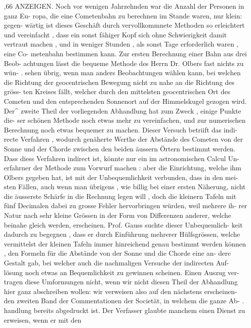 \documentclass[12pt,a4paper]{article}
\begin{document}
,66  ANZEIGEN.
Noch  vor  wenigen  Jahrzehnden  war  die  Anzahl  der  Personen  in  ganz  Eu-
ropa, die  eine  Cometenbahn  zu  berechnen  im  Stande  waren,  nur  klein:  gegen-
wärtig ist  dieses  Geschäft  durch  vervollkommnete  Methoden  so  erleichtert  und
vereinfacht ,  dass  ein  sonst  fähiger  Kopf  sich  ohne  Schwierigkeit  damit  vertraut
machen ,  und  in  weniger  Stunden ,  als  sonst  Tage  erforderlich  waren ,  eine  Co-
metenbahn bestimmen  kann.  Zur  ersten  Berechnung  einer  Bahn  aus  drei  Beob-
achtungen lässt  die  bequeme  Methode  des  Herrn  Dr.  Olbers  fast  nichts  zu  wün- .
sehen  übrig,  wenn  man  anders  Beobachtungen  wählen  kann,  bei  welchen  die
Richtung  der  geocentrischen  Bewegung  nicht  zu  nahe  an  die  Richtung  des  gröss-
ten  Kreises  fällt,  welcher  durch  den  mittelsten  geocentrischen  Ort  des  Cometen
und  den  entsprechenden  Sonnenort  auf  der  Himmelskugel  gezogen  wird.  Der\^{}
zweite  Theil  der  vorliegenden  Abhandlung  hat  zum  Zweck ,  einige  Punkte  die-
ser schönen  Methode  noch  etwas  mehr  zu  vereinfachen,  und  zur  numerischen
Berechnung  noch  etwas  bequemer  zu  machen.  Dieser  Versuch  betriift  das  indi-
recte  Verfahren ,  wodurch  genäherte  Werthe  der  Abstände  des  Cometen  von  der
Sonne  und  der  Chorde  zwischen  den  beiden  äussern  Örtern  bestimmt  werden.
Dass  diess  Verfahren  indirect  ist,  könnte  nur  ein  im  astronomischen  Calcul  Un-
erfahrner der  Methode  zum  Vorwurf  machen :  aber  die  Einrichtung,  welche  ihm
Olbers  gegeben  hat,  ist  mit  der  Unbequemlichkeit  verbunden,  dass  in  den  mei-
sten Fällen,  auch  wenn  man  übrigens ,  wie  billig  bei  einer  ersten  Näherung,  nicht
die  äusserste  Schärfe  in  die  Rechnung  legen  will ,  doch  die  kleinern  Tafeln  mit
fünf  Decimalen  dabei  zu  grosse  Fehler  hervorbringen  würden,  weil  mehrere  ih-
rer Natur  nach  sehr  kleine  Grössen  in  der  Form  von  Differenzen  anderer,  welche
beinahe  gleich  werden,  erscheinen.  Prof.  Gauss  suchte  dieser  Unbequemlich-
keit dadurch  zu  begegnen ,  dass  er  durch  Einführung  mehrerer  Hülfsgrössen,
welche  vermittelst  der  kleinen  Tafeln  immer  hinreichend  genau  bestimmt  werden
können ,  den  Formeln  für  die  Abstände  von  der  Sonne  und  die  Chorde  eine  an-
dere Gestalt  gab,  bei  welcher  auch  die  nachmaligen  Versuche  der  indirecten  Auf-
lösung noch  etwas  an  Bequemlichkeit  zu  gewinnen  scheinen.  Einen  Auszug  ver-
tragen diese  Umformungen  nicht,  wenn  wir  nicht  diesen  Theil  der  Abhandlung
hier  ganz  abschreiben  wollen:  wir  verweisen  also  auf  den  nächstens  erscheinen-
den zweiten  Band  der  Commentationen  der  Societät,  in  welchem  die  ganze  Ab-  .
handlung  bereits  abgedruckt  ist.
Der  Verfasser  glaubte  manchem  einen  Dienst  zu  erweisen,  wenn  er  mit  den
\end{document}

